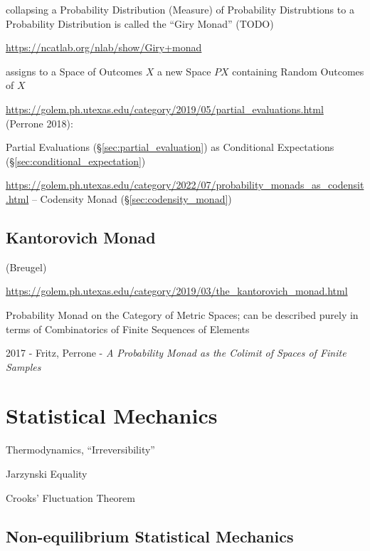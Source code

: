 collapsing a Probability Distribution (Measure) of Probability Distrubtions to a
Probability Distribution is called the ``Giry Monad'' (TODO)

\url{https://ncatlab.org/nlab/show/Giry+monad}

assigns to a Space of Outcomes $X$ a new Space $P X$ containing Random Outcomes
of $X$

\url{https://golem.ph.utexas.edu/category/2019/05/partial_evaluations.html}
(Perrone 2018):

Partial Evaluations (\S\ref{sec:partial_evaluation}) as Conditional Expectations
(\S\ref{sec:conditional_expectation})

\url{https://golem.ph.utexas.edu/category/2022/07/probability_monads_as_codensit.html}
-- Codensity Monad (\S\ref{sec:codensity_monad})



\subsection{Kantorovich Monad}\label{sec:kantorovich_monad}

(Breugel)

\url{https://golem.ph.utexas.edu/category/2019/03/the_kantorovich_monad.html}

Probability Monad on the Category of Metric Spaces; can be described purely in
terms of Combinatorics of Finite Sequences of Elements

2017 - Fritz, Perrone - \emph{A Probability Monad as the Colimit of Spaces of
  Finite Samples}



\section{Statistical Mechanics}\label{sec:statistical_mechanics}

Thermodynamics, ``Irreversibility''

Jarzynski Equality

Crooks' Fluctuation Theorem



\subsection{Non-equilibrium Statistical Mechanics}
\label{sec:nonequilibrium_statistical_mechanics}

